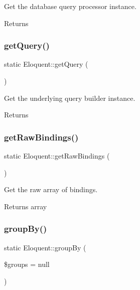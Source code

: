 Get the database query processor instance.

\begin{DoxyReturn}{Returns}

\end{DoxyReturn}
\mbox{\label{class_eloquent_a4c4d0601b74e31267f0526b02438e155}} 
\subsubsection{\texorpdfstring{get\+Query()}{getQuery()}}
{\footnotesize\ttfamily static Eloquent\+::get\+Query (\begin{DoxyParamCaption}{ }\end{DoxyParamCaption})\hspace{0.3cm}{\ttfamily [static]}}

Get the underlying query builder instance.

\begin{DoxyReturn}{Returns}

\end{DoxyReturn}
\mbox{\label{class_eloquent_a0e2f203149983e1293a215f5d010e014}} 
\subsubsection{\texorpdfstring{get\+Raw\+Bindings()}{getRawBindings()}}
{\footnotesize\ttfamily static Eloquent\+::get\+Raw\+Bindings (\begin{DoxyParamCaption}{ }\end{DoxyParamCaption})\hspace{0.3cm}{\ttfamily [static]}}

Get the raw array of bindings.

\begin{DoxyReturn}{Returns}
array 
\end{DoxyReturn}
\mbox{\label{class_eloquent_aeebb6f260f6d6fd5afab7b02ff15248a}} 
\subsubsection{\texorpdfstring{group\+By()}{groupBy()}}
{\footnotesize\ttfamily static Eloquent\+::group\+By (\begin{DoxyParamCaption}\item[{}]{\$groups = {\ttfamily null} }\end{DoxyParamCaption})\hspace{0.3cm}{\ttfamily [static]}}

